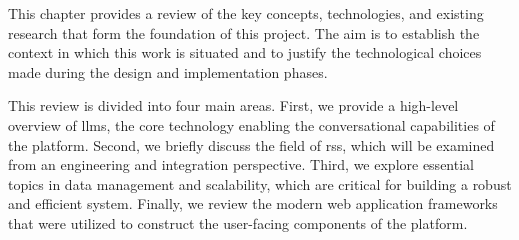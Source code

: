 This chapter provides a review of the key concepts, technologies, and existing research that form the foundation of this project. The aim is to establish the context in which this work is situated and to justify the technological choices made during the design and implementation phases.

This review is divided into four main areas. First, we provide a high-level overview of \acp{llm}, the core technology enabling the conversational capabilities of the platform. Second, we briefly discuss the field of \acl{rs}s, which will be examined from an engineering and integration perspective. Third, we explore essential topics in data management and scalability, which are critical for building a robust and efficient system. Finally, we review the modern web application frameworks that were utilized to construct the user-facing components of the platform.